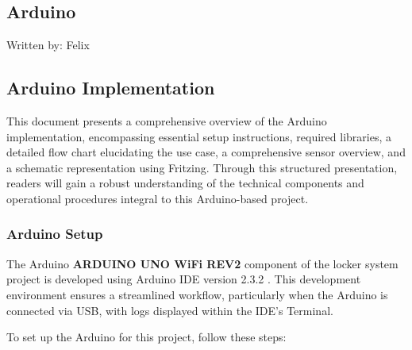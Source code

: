 \subsection{Arduino}
{\tiny Written by: Felix}

\subsection{Arduino Implementation}

This document presents a comprehensive overview of the Arduino implementation, encompassing essential setup instructions, required libraries, a detailed flow chart elucidating the use case, a comprehensive sensor overview, and a schematic representation using Fritzing. Through this structured presentation, readers will gain a robust understanding of the technical components and operational procedures integral to this Arduino-based project.

\subsubsection{Arduino Setup}

The Arduino \textbf{ARDUINO UNO WiFi REV2} \cite{arduino_uno_wifi_rev2} component of the locker system project is developed using Arduino IDE version 2.3.2 \cite{arduino-software}. This development environment ensures a streamlined workflow, particularly when the Arduino is connected via USB, with logs displayed within the IDE's Terminal.

To set up the Arduino for this project, follow these steps:

